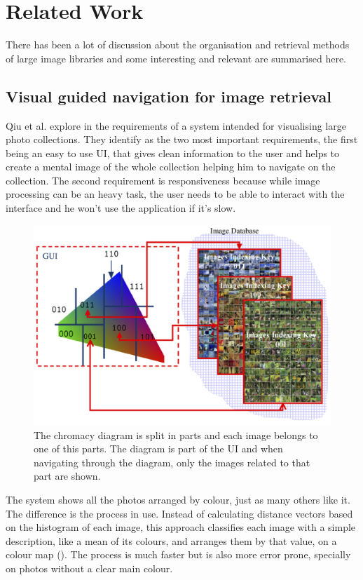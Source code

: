 \chapter{Related Work}
\label{chapter:related-work}


There has been a lot of discussion about the organisation and retrieval methods of large image libraries and some interesting and relevant are summarised here.

\section{Visual guided navigation for image retrieval} %
\label{sub:Qiu}

Qiu et al. explore in \cite{Qiu:2007p1207} the requirements of a system intended for visualising large photo collections. They identify as the two most important requirements, the first being an easy to use \ac{UI}, that gives clean information to the user and helps to create a mental image of the whole collection helping him to navigate on the collection. The second requirement is responsiveness because while image processing can be an heavy task, the user needs to be able to interact with the interface and he won't use the application if it's slow. 

\begin{figure}[ht]
	\centering
		\includegraphics[width=0.6\columnwidth]{imgs/Qiu-2007p1207.png}
	\caption{The chromacy diagram is split in parts and each image belongs to one of this parts. The diagram is part of the \ac{UI} and  when navigating through the diagram, only the images related to that part are shown.}
	\label{fig:qiu1}
\end{figure}

The system shows all the photos arranged by colour, just as many others like it. The difference is the process in use. Instead of calculating distance vectors based on the histogram of each image, this approach classifies each image with a simple description, like a mean of its colours, and arranges them by that value, on a colour map (). The process is much faster but is also more error prone, specially on photos without a clear main colour.

